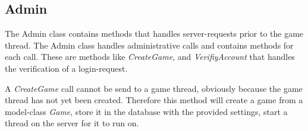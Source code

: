 \subsection{Admin}\label{subsec:admindesign}
The Admin class contains methods that handles server-requests prior to the game thread. The Admin class handles administrative calls and contains methods for each call. These are methods like \textit{CreateGame}, and \textit{VerifiyAccount} that handles the verification of a login-request. 

A \textit{CreateGame} call cannot be send to a game thread, obviously because the game thread has not yet been created. Therefore this method will create a game from a model-class \textit{Game}, store it in the database with the provided settings, start a thread on the server for it to run on. 

